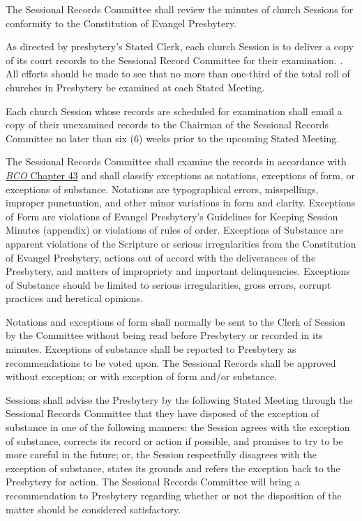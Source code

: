 \documentclass[
]{book}
\begin{document}
\begin{enumerate}
\begin{enumerate}
    The Sessional Records Committee shall review the minutes of church Sessions for conformity to the Constitution of Evangel Presbytery.

    As directed by presbytery's Stated Clerk, each church Session is to deliver a copy of its court records to the Sessional Record Committee for their examination. . All efforts should be made to see that no more than one-third of the total roll of churches in Presbytery be examined at each Stated Meeting.

    Each church Session whose records are scheduled for examination shall email a copy of their unexamined records to the Chairman of the Sessional Records Committee no later than six (6) weeks prior to the upcoming Stated Meeting.

    The Sessional Records Committee shall examine the records in accordance with \href{https://bco.evangelpresbytery.com/the-rules-of-discipline.html\#general-review-and-control}{\emph{BCO} Chapter 43} and shall classify exceptions as notations, exceptions of form, or exceptions of substance. Notations are typographical errors, misspellings, improper punctuation, and other minor variations in form and clarity. Exceptions of Form are violations of Evangel Presbytery's Guidelines for Keeping Session Minutes (appendix) or violations of rules of order. Exceptions of Substance are apparent violations of the Scripture or serious irregularities from the Constitution of Evangel Presbytery, actions out of accord with the deliverances of the Presbytery, and matters of impropriety and important delinquencies. Exceptions of Substance should be limited to serious irregularities, gross errors, corrupt practices and heretical opinions.

    Notations and exceptions of form shall normally be sent to the Clerk of Session by the Committee without being read before Presbytery or recorded in its minutes. Exceptions of substance shall be reported to Presbytery as recommendations to be voted upon. The Sessional Records shall be approved without exception; or with exception of form and/or substance.

    Sessions shall advise the Presbytery by the following Stated Meeting through the Sessional Records Committee that they have disposed of the exception of substance in one of the following manners: the Session agrees with the exception of substance, corrects its record or action if possible, and promises to try to be more careful in the future; or, the Session respectfully disagrees with the exception of substance, states its grounds and refers the exception back to the Presbytery for action. The Sessional Records Committee will bring a recommendation to Presbytery regarding whether or not the disposition of the matter should be considered satisfactory.


\end{enumerate}
\end{enumerate}
\end{document}
